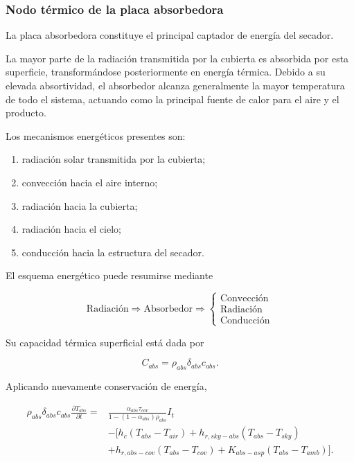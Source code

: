 \subsubsection{Nodo térmico de la placa absorbedora}

La placa absorbedora constituye el principal captador de energía del secador.

La mayor parte de la radiación transmitida por la cubierta es absorbida por esta superficie, transformándose posteriormente en energía térmica. Debido a su elevada absortividad, el absorbedor alcanza generalmente la mayor temperatura de todo el sistema, actuando como la principal fuente de calor para el aire y el producto.

Los mecanismos energéticos presentes son:

\begin{enumerate}

\item radiación solar transmitida por la cubierta;

\item convección hacia el aire interno;

\item radiación hacia la cubierta;

\item radiación hacia el cielo;

\item conducción hacia la estructura del secador.

\end{enumerate}

El esquema energético puede resumirse mediante

\[
\boxed{
\text{Radiación}
\Longrightarrow
\boxed{\text{Absorbedor}}
\Longrightarrow
\left\{
\begin{array}{c}
\text{Convección}\\
\text{Radiación}\\
\text{Conducción}
\end{array}
\right.
}
\]

Su capacidad térmica superficial está dada por

\[
C_{abs}
=
\rho_{abs}\delta_{abs}c_{abs}.
\]

Aplicando nuevamente conservación de energía,

\begin{equation}
\boxed{
\begin{aligned}
\rho_{abs}\delta_{abs}c_{abs}
\frac{\partial T_{abs}}{\partial t}
=
&
\frac{\alpha_{abs}\tau_{cov}}
{1-(1-\alpha_{abs})\rho_{abs}}
I_t
\\
&
-
\Big[
h_c(T_{abs}-T_{air})
+
h_{r,sky-abs}(T_{abs}-T_{sky})
\\
&
+
h_{r,abs-cov}(T_{abs}-T_{cov})
+
K_{abs-asp}(T_{abs}-T_{amb})
\Big].
\end{aligned}
}
\end{equation}

